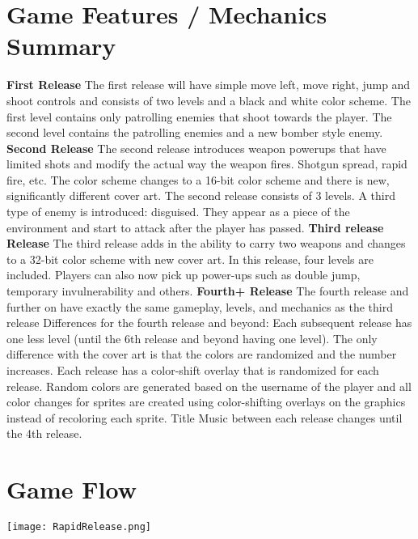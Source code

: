 \documentclass[11pt,fleqn]{book} %
\begin{document}
\section{Game Features / Mechanics Summary}
\begin{flushleft}
	\begin{outline}
		\1 \textbf{First Release}
			\2 The first release will have simple move left, move right, jump and shoot controls and consists of two levels and a black and white color scheme.
			\2 The first level contains only patrolling enemies that shoot towards the player.
			\2 The second level contains the patrolling enemies and a new bomber style enemy.
		\1 \textbf{Second Release}
			\2 The second release introduces weapon powerups that have limited shots and modify the actual way the weapon fires.
				\3 Shotgun spread, rapid fire, etc.
			\2 The color scheme changes to a 16-bit color scheme and there is new, significantly different cover art.
			\2 The second release consists of 3 levels.
				\3 A third type of enemy is introduced: disguised. They appear as a piece of the environment and start to attack after the player has passed.
		\1 \textbf{Third release Release}
			\2 The third release adds in the ability to carry two weapons and changes to a 32-bit color scheme with new cover art.
			\2 In this release, four levels are included.
			\2 Players can also now pick up power-ups such as double jump, temporary invulnerability and others.
		\1 \textbf{Fourth+ Release}
			\2 The fourth release and further on have exactly the same gameplay, levels, and mechanics  as the third release
			\2 Differences for the fourth release and beyond:
				\3 Each subsequent release has one less level (until the 6th release and beyond having one level).
				\3 The only difference with the cover art is that the colors are randomized and the number increases.
				\3 Each release has a color-shift overlay that is randomized for each release.
		\1 Random colors are generated based on the username of the player and all color changes for sprites are created using color-shifting overlays on the graphics instead of recoloring each sprite.
		\1 Title Music between each release changes until the 4th release.
	\end{outline}
\end{flushleft}

\vspace{-\baselineskip}

\section{Game Flow}
\begin{center}
		\texttt{[image: RapidRelease.png]}
\end{center}
\vspace{-\baselineskip}
\end{document}
